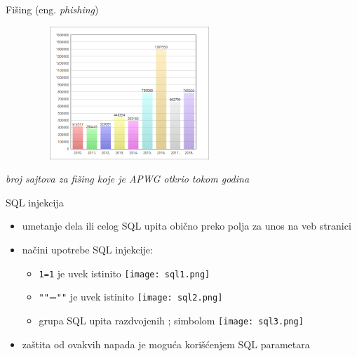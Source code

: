 \begin{frame}{Fišing (eng. \textit{phishing})}
        \begin{minipage}{\textwidth}
            \centering
            \vspace{0.3cm}
            \includegraphics[width=0.7\textwidth, height = 5cm]{images/phishing.png}
        \end{minipage}
        \begin{minipage}{\textwidth}
            \centering
            \textit{broj sajtova za fišing koje je APWG otkrio tokom godina}
        \end{minipage}
    \end{frame}

\begin{frame}{SQL injekcija}
        
            \begin{itemize}
                \item umetanje dela ili celog SQL upita obično preko polja za unos na veb stranici
                \item načini upotrebe SQL injekcije:
                		\begin{itemize}
                		\item \texttt{1=1} je uvek istinito
                		        \texttt{[image: sql1.png]}
                		\item \texttt{"}\texttt{"}=\texttt{"}\texttt{"} je uvek istinito
                		        \texttt{[image: sql2.png]}                		        
                		\item grupa SQL upita razdvojenih ; simbolom
                		        \texttt{[image: sql3.png]}
                		\end{itemize}
                	\item zaštita od ovakvih napada je moguća korišćenjem SQL parametara
            \end{itemize}
    \end{frame}


